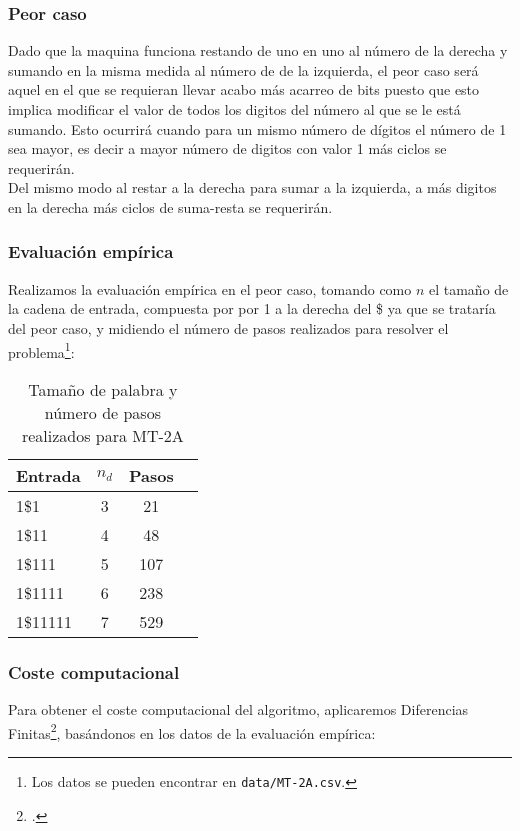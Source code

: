 


\subsubsection*{Peor caso}
Dado que la maquina funciona restando de uno en uno al número de la derecha y sumando en la misma medida al número de de la izquierda, el peor caso será aquel en el que se requieran llevar acabo más acarreo de bits puesto que esto implica modificar el valor de todos los digitos del número al que se le está sumando. Esto ocurrirá cuando para un mismo número de dígitos el número de 1 sea mayor, es decir a mayor número de digitos con valor 1 más ciclos se requerirán.\\
Del mismo modo al restar a la derecha para sumar a la izquierda, a más digitos en la derecha más ciclos de suma-resta se requerirán.

\subsubsection*{Evaluación empírica}
Realizamos la evaluación empírica en el peor caso, tomando como $n$ el tamaño de la cadena de entrada, compuesta por por 1 a la derecha del \$ ya que se trataría del peor caso, y midiendo el número de pasos realizados para resolver el problema\footnote{Los datos se pueden encontrar en \texttt{data/MT-2A.csv}.}:

\begin{table}[h]
    \centering
    \begin{tabular}{lccc}
        Entrada & $n_d$ & Pasos \\
        \hline
        1\$1                     & 3  & 21   \\
        1\$11                    & 4  & 48   \\
        1\$111                   & 5  & 107  \\
        1\$1111                  & 6  & 238  \\
        1\$11111                 & 7  & 529  \\
    \end{tabular}
    \caption{Tamaño de palabra y número de pasos realizados para MT-2A}
\end{table}


\subsubsection*{Coste computacional}
Para obtener el coste computacional del algoritmo, aplicaremos Diferencias Finitas\footcite[ver][pgs. 1-42: \textit{Chapter 1. Difference Tables and Polynomial Fits}]{cuoco2005mathematical}, basándonos en los datos de la evaluación empírica:


